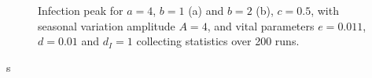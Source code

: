 \begin{figure}
    \centering
    \caption{Infection peak for $a=4$, $b=1$ (a) and $b=2$ (b), $c=0.5$, with seasonal variation amplitude $A = 4$, and vital parameters $e=0.011$, $d=0.01$ and $d_I=1$ collecting statistics over 200 runs.}
    \label{fig:seasonalI_peak}
\end{figure}s


